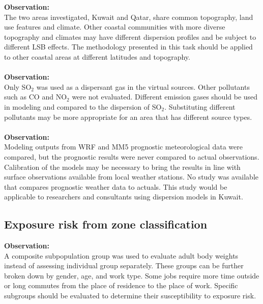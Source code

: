 \noindent
\textbf{Observation:}\\
The two areas investigated, Kuwait and Qatar, share common topography, land use features and climate. Other coastal communities with more diverse topography and climates may have different dispersion profiles and be subject to different LSB effects. The methodology presented in this task should be applied to other coastal areas at different latitudes and topography.\\
\noindent\\
\textbf{Observation:}\\
Only SO$_{2}$ was used as a dispersant gas in the virtual sources. Other pollutants such as CO and NO$_{2}$ were not evaluated. Different emission gases should be used in modeling and compared to the dispersion of SO$_{2}$. Substituting different pollutants may be more appropriate for an area that has different source types.\\
\noindent\\
\textbf{Observation:}\\
Modeling outputs from WRF and MM5 prognostic meteorological data were compared, but the prognostic results were never compared to actual observations. Calibration of the models may be necessary to bring the results in line with surface observations available from local weather stations. No study was available that compares prognostic weather data to actuals. This study would be applicable to researchers and consultants using dispersion models in Kuwait.

\subsection*{Exposure risk from zone classification}
\noindent
\textbf{Observation:}\\
A composite subpopulation group was used to evaluate adult body weights instead of assessing individual group separately. These groups can be further broken down by gender, age, and work type. Some jobs require more time outside or long commutes from the place of residence to the place of work. Specific subgroups should be evaluated to determine their susceptibility to exposure risk.\\

